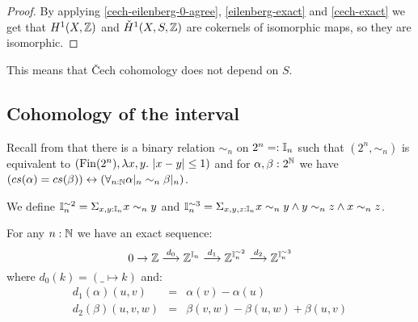 \begin{proof}
By applying \cref{cech-eilenberg-0-agree}, \cref{eilenberg-exact} and \cref{cech-exact} we get that $H^1(X,\mathbb{Z})$ and $\check{H}^1(X,S,\mathbb{Z})$ are cokernels of isomorphic maps, so they are isomorphic.
\end{proof}

This means that \v{C}ech cohomology does not depend on $S$.

\subsection{Cohomology of the interval}
%
%
\begin{remark}\label{description-Cn-simn}
  Recall from  that 
  there is a binary relation $\sim_n$ on $2^n=:\mathbb{I}_n$ such that 
  $(2^n,\sim_n)$ is equivalent to  $(\Fin(2^n),\lambda x,y.\ |x-y|\leq 1)$
  and for $\alpha,\beta:2^{\mathbb{N}}$ we have $(cs(\alpha) = cs(\beta)) \leftrightarrow 
  \left(\forall_{n:\mathbb{N}}\alpha|_n \sim_n \beta|_n\right)$. 
\end{remark}

We define $\mathbb{I}_n^{\sim2} = \Sigma_{x,y:\mathbb{I}_n}x\sim_n y$ and $\mathbb{I}_n^{\sim3} = \Sigma_{x,y,z:\mathbb{I}_n}x\sim_n y \land y\sim_n z\land x\sim_n z$.

\begin{lemma}\label{Cn-exact-sequence}
For any $n:\mathbb{N}$ we have an exact sequence:
\[0\to \mathbb{Z}\overset{d_0}{\longrightarrow} \mathbb{Z}^{\mathbb{I}_n} \overset{d_1}{\longrightarrow} \mathbb{Z}^{\mathbb{I}_n^{\sim2}} \overset{d_2}{\longrightarrow} \mathbb{Z}^{\mathbb{I}_n^{\sim3}}\]
where $d_0(k) = (\_\mapsto k)$ and:
\begin{eqnarray}
 d_1(\alpha)(u,v) &=& \alpha(v)-\alpha(u)\nonumber\\
 d_2(\beta)(u,v,w) &=& \beta(v,w)-\beta(u,w)+\beta(u,v)\nonumber
\end{eqnarray}
\end{lemma}

